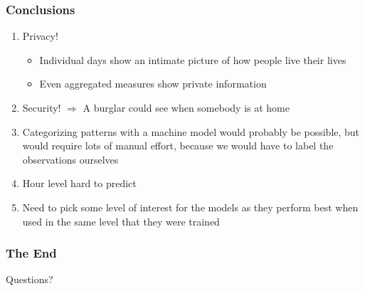 \documentclass[10pt]{beamer}
\begin{document}
\begin{frame}
\frametitle{Conclusions}

\begin{enumerate}
    \item Privacy!
    \begin{itemize}
        \item Individual days show an intimate picture of how people live their lives
        \item Even aggregated measures show private information
    \end{itemize}
    \item Security! \(\Rightarrow \) A burglar could see when somebody is at home
    \item Categorizing patterns with a machine model would probably be possible, but would require
    lots of manual effort, because we would have to label the observations ourselves
    \item Hour level hard to predict
    \item Need to pick some level of interest for the models as they perform best when
    used in the same level that they were trained
\end{enumerate}

\end{frame}

\begin{frame}
\frametitle{The End}

\LARGE{\centerline{Questions?}}

\end{frame}

\end{document}
